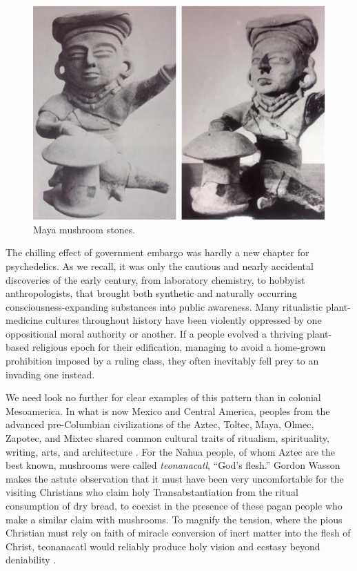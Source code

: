 \documentclass{UIdahoMastersThesis}
\begin{document}
\begin{figure}%
	\centering
	\includegraphics[width=0.72\linewidth]{shrooms.jpg}
	\caption{Maya mushroom stones.}
	\label{fig:shrooms}
\end{figure}

The chilling effect of government embargo was hardly a new chapter for psychedelics. As we recall, it was only the cautious and nearly accidental discoveries of the early  century, from laboratory chemistry, to hobbyist anthropologists, that brought both synthetic and naturally occurring consciousness-expanding substances into public awareness. Many ritualistic plant-medicine cultures throughout history have been violently oppressed by one oppositional moral authority or another. If a people evolved a thriving plant-based religious epoch for their edification, managing to avoid a home-grown prohibition imposed by a ruling class, they often inevitably fell prey to an invading one instead.

We need look no further for clear examples of this pattern than in colonial Mesoamerica. In what is now Mexico and Central America, peoples from the advanced pre-Columbian civilizations of the Aztec, Toltec, Maya, Olmec, Zapotec, and Mixtec shared common cultural traits of ritualism, spirituality, writing, arts, and architecture \cite{gallenkamp1959maya}. For the Nahua people, of whom Aztec are the best known, mushrooms were called \emph{teonanacatl}, ``God's flesh.''  Gordon Wasson makes the astute observation that it must have been very uncomfortable for the visiting Christians who claim holy Transabstantiation from the ritual consumption of dry bread, to coexist in the presence of these pagan people who make a similar claim with mushrooms. To magnify the tension, where the pious Christian must rely on faith of miracle conversion of inert matter into the flesh of Christ, teonanacatl would reliably produce holy vision and ecstasy beyond deniability \cite{wasson1980wondrous}.
\end{document}
